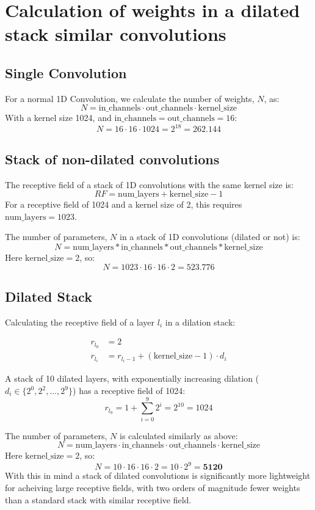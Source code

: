 \section{Calculation of weights in a dilated stack similar convolutions}\label{appx:dilation-weights}

\subsection{Single Convolution}
For a normal 1D Convolution, we calculate the number of weights, \(N\), as: 
\[
N = \text{in\_channels}\cdot\text{out\_channels}\cdot\text{kernel\_size}
\]
With a kernel size 1024, and \(\text{in\_channels}=\text{out\_channels}=16\): 
\[
N=16\cdot16\cdot1024=2^{18}=262.144
\] 

\subsection{Stack of non-dilated convolutions}
The receptive field of a stack of 1D convolutions with the same kernel size is: 
\[
RF = \text{num\_layers} + \text{kernel\_size} -1
\]
For a receptive field of 1024 and a kernel size of 2, this requires $\text{num\_layers}=1023$. 

The number of parameters, $N$ in a stack of 1D convolutions (dilated or not) is:
\[
N = \text{num\_layers} * \text{in\_channels} * \text{out\_channels} * \text{kernel\_size}
\]
Here \(\text{kernel\_size}=2\), so: 
\[
N = 1023 \cdot 16 \cdot 16 \cdot 2 = 523.776
\] 

\subsection{Dilated Stack}
Calculating the receptive field of a layer $l_i$ in a dilation stack:

\begin{equation*}
\begin{split}
r_{l_0} &= 2 \\
r_{l_i} &= r_{l_i-1} + (\text{kernel\_size} - 1) \cdot d_i
\end{split}
\end{equation*}


A stack of 10 dilated layers, with exponentially increasing dilation (\(d_i\in \{2^0,2^2, ..., 2^9 \}\)) has a receptive field of 1024:
\[
r_{l_9} = 1 + \sum_{i=0}^9 2^i = 2^{10} = 1024 
\]


The number of parameters, $N$ is calculated similarly as above:
\[
N = \text{num\_layers} \cdot \text{in\_channels} \cdot \text{out\_channels} \cdot \text{kernel\_size}
\] 
Here \(\text{kernel\_size}=2\), so: 
\[
N = 10 \cdot 16 \cdot 16 \cdot 2 = 10 \cdot 2^{9} = \mathbf{5120}
\] 
With this in mind a stack of dilated convolutions is significantly more lightweight for acheiving large receptive fields, with two orders of magnitude fewer weights than a standard stack with similar receptive field. 

